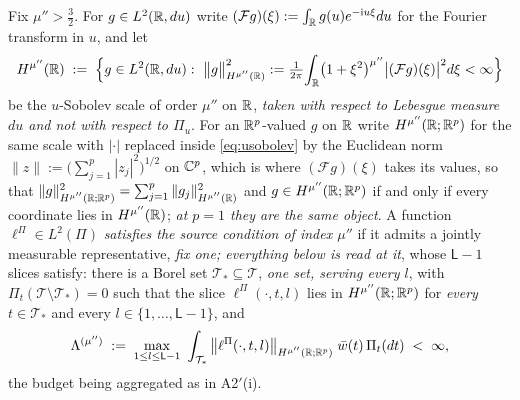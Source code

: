 \begin{assumption}\label{ass:reprsource}
Fix $\mu''>\tfrac32$. For $g\in L^{2}(\mathbb{R},du)$ write $(\mathcal Fg)(\xi):=\int_{\mathbb{R}}g(u)e^{-\mathrm iu\xi}du$
for the Fourier transform in $u$, and let
\begin{equation}\label{eq:usobolev}
H^{\mu''}(\mathbb{R})\;:=\;\Big\{g\in L^{2}(\mathbb{R},du):\
\big\|g\big\|^{2}_{H^{\mu''}(\mathbb{R})}:=\tfrac{1}{2\pi}\!\int_{\mathbb{R}}\!\big(1+\xi^{2}\big)^{\mu''}\big|(\mathcal Fg)(\xi)\big|^{2}d\xi<\infty\Big\}
\end{equation}
be the $u$-Sobolev scale of order $\mu''$ on $\mathbb{R}$, \emph{taken with respect to Lebesgue measure $du$ and
not with respect to $\Pi_u$}. For an $\mathbb{R}^{p}$-valued $g$ on $\mathbb{R}$ write
$H^{\mu''}(\mathbb{R};\mathbb{R}^{p})$ for the same scale with $|\cdot|$ replaced inside \eqref{eq:usobolev} by the
Euclidean norm $\|z\|:=\big(\sum_{j=1}^{p}|z_j|^{2}\big)^{1/2}$ on $\mathbb{C}^{p}$, which is where
$(\mathcal Fg)(\xi)$ takes its values, so that
$\|g\|^{2}_{H^{\mu''}(\mathbb{R};\mathbb{R}^{p})}=\sum_{j=1}^{p}\|g_j\|^{2}_{H^{\mu''}(\mathbb{R})}$ and
$g\in H^{\mu''}(\mathbb{R};\mathbb{R}^{p})$ if and only if every coordinate lies in $H^{\mu''}(\mathbb{R})$;
\emph{at $p=1$ they are the same object}.
A function $\ell^\Pi\in L^{2}(\Pi)$ \emph{satisfies the source condition of
index $\mu''$} if it admits a jointly measurable representative, \emph{fix one; everything below is
read at it}, whose $\mathsf L-1$ slices satisfy: there is a Borel set
$\mathcal T_\ast\subseteq\mathcal T$, \emph{one set, serving every $l$}, with
$\Pi_t(\mathcal T\setminus\mathcal T_\ast)=0$ such that the
slice $\ell^\Pi(\cdot,t,l)$ lies in $H^{\mu''}(\mathbb{R};\mathbb{R}^{p})$ for \emph{every} $t\in\mathcal T_\ast$ and
every $l\in\{1,\dots,\mathsf L-1\}$, and
\begin{equation}\label{eq:lambdamu}
\Lambda^{(\mu'')}\;:=\;\max_{1\le l\le\mathsf L-1}\ \int_{\mathcal T_\ast}\big\|\ell^\Pi(\cdot,t,l)\big\|_{H^{\mu''}(\mathbb{R};\mathbb{R}^{p})}\;\bar w(t)\,\Pi_t(dt)\;<\;\infty ,
\end{equation}
the budget being aggregated as in A2$'$(i).
\end{assumption}

